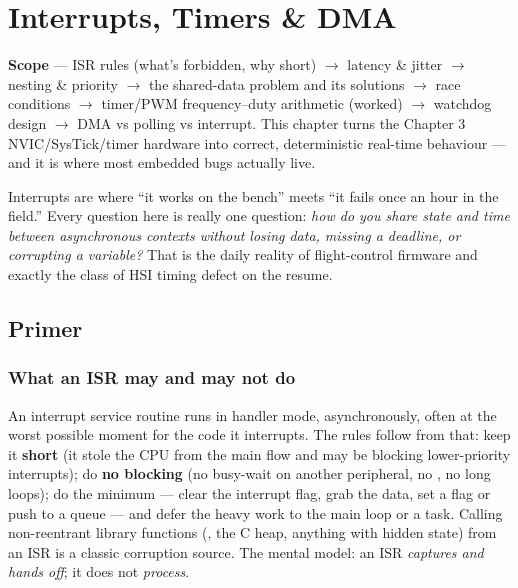 
\chapter{Interrupts, Timers \& DMA}
\label{ch:interrupts-timers-dma}

\begin{partnote}
\textbf{Scope} --- ISR rules (what's forbidden, why short) $\rightarrow$
latency \& jitter $\rightarrow$ nesting \& priority $\rightarrow$ the
shared-data problem and its solutions $\rightarrow$ race conditions
$\rightarrow$ timer/PWM frequency--duty arithmetic (worked) $\rightarrow$
watchdog design $\rightarrow$ DMA vs polling vs interrupt. This chapter turns
the Chapter 3 NVIC/SysTick/timer hardware into correct, deterministic
real-time behaviour --- and it is where most embedded bugs actually live.
\end{partnote}

Interrupts are where ``it works on the bench'' meets ``it fails once an hour in
the field.'' Every question here is really one question: \emph{how do you share
state and time between asynchronous contexts without losing data, missing a
deadline, or corrupting a variable?} That is the daily reality of flight-control
firmware and exactly the class of HSI timing defect on the resume.

\section{Primer}

\subsection{What an ISR may and may not do}

An interrupt service routine runs in handler mode, asynchronously, often at the
worst possible moment for the code it interrupts. The rules follow from that:
keep it \textbf{short} (it stole the CPU from the main flow and may be blocking
lower-priority interrupts); do \textbf{no blocking} (no busy-wait on another
peripheral, no , no long loops); do the minimum --- clear the
interrupt flag, grab the data, set a flag or push to a queue --- and defer the
heavy work to the main loop or a task. Calling non-reentrant library functions
(, the C heap, anything with hidden  state) from an
ISR is a classic corruption source. The mental model: an ISR \emph{captures and
hands off}; it does not \emph{process}.

